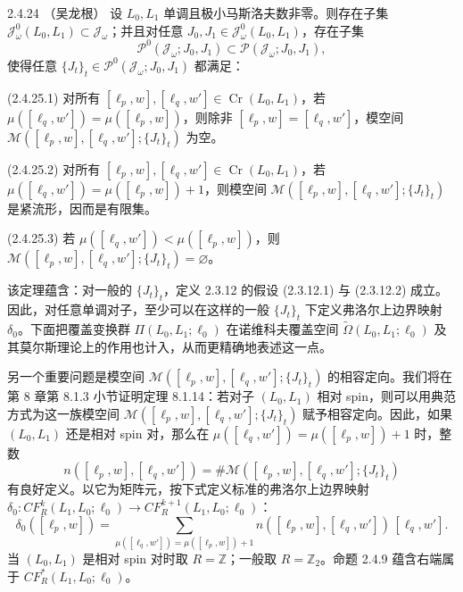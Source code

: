 \begin{theorem}{2.4.24}\label{thm:2-4-24}
\textup{（吴龙根）}\quad
设 $L_0,L_1$ 单调且极小马斯洛夫数非零。则存在子集
$\mathcal J_\omega^0(L_0,L_1)\subset\mathcal J_\omega$；并且对任意
$J_0,J_1\in\mathcal J_\omega^0(L_0,L_1)$，存在子集
\[
  \mathcal P^0(\mathcal J_\omega;J_0,J_1)
  \subset\mathcal P(\mathcal J_\omega;J_0,J_1),
\]
使得任意 $\{J_t\}_t\in\mathcal P^0(\mathcal J_\omega;J_0,J_1)$ 都满足：

\par\smallskip\noindent\textup{(2.4.25.1)}\quad
对所有 $[\ell_p,w],[\ell_q,w']\in\operatorname{Cr}(L_0,L_1)$，若
$\mu([\ell_q,w'])=\mu([\ell_p,w])$，则除非
$[\ell_p,w]=[\ell_q,w']$，模空间
$\mathcal M([\ell_p,w],[\ell_q,w'];\{J_t\}_t)$ 为空。

\par\smallskip\noindent\textup{(2.4.25.2)}\quad
对所有 $[\ell_p,w],[\ell_q,w']\in\operatorname{Cr}(L_0,L_1)$，若
$\mu([\ell_q,w'])=\mu([\ell_p,w])+1$，则模空间
$\mathcal M([\ell_p,w],[\ell_q,w'];\{J_t\}_t)$ 是紧流形，因而是有限集。

\par\smallskip\noindent\textup{(2.4.25.3)}\quad
若 $\mu([\ell_q,w'])<\mu([\ell_p,w])$，则
$\mathcal M([\ell_p,w],[\ell_q,w'];\{J_t\}_t)=\varnothing$。
\end{theorem}

该定理蕴含：对一般的 $\{J_t\}_t$，定义 2.3.12 的假设 (2.3.12.1) 与 (2.3.12.2) 成立。因此，对任意单调对子，至少可以在这样的一般 $\{J_t\}_t$ 下定义弗洛尔上边界映射 $\delta_0$。下面把覆盖变换群 $\Pi(L_0,L_1;\ell_0)$ 在诺维科夫覆盖空间 $\widetilde\Omega(L_0,L_1;\ell_0)$ 及其莫尔斯理论上的作用也计入，从而更精确地表述这一点。

另一个重要问题是模空间
$\mathcal M([\ell_p,w],[\ell_q,w'];\{J_t\}_t)$ 的相容定向。我们将在第 8 章第 8.1.3 小节证明定理 8.1.14：若对子 $(L_0,L_1)$ 相对 spin，则可以用典范方式为这一族模空间
$\mathcal M([\ell_p,w],[\ell_q,w'];\{J_t\}_t)$ 赋予相容定向。因此，如果 $(L_0,L_1)$ 还是相对 spin 对，那么在
$\mu([\ell_q,w'])=\mu([\ell_p,w])+1$ 时，整数
\[
  n([\ell_p,w],[\ell_q,w'])
  =\#\mathcal M([\ell_p,w],[\ell_q,w'];\{J_t\}_t)
\]
有良好定义。以它为矩阵元，按下式定义标准的弗洛尔上边界映射
$\delta_0:CF_R^k(L_1,L_0;\ell_0)\to CF_R^{k+1}(L_1,L_0;\ell_0)$：
\begin{equation}
  \delta_0([\ell_p,w])
  =\sum_{\mu([\ell_q,w'])=\mu([\ell_p,w])+1}
    n([\ell_p,w],[\ell_q,w'])\,[\ell_q,w'].
  \tag{2.4.26}\label{eq:2-4-26}
\end{equation}
当 $(L_0,L_1)$ 是相对 spin 对时取 $R=\mathbb Z$；一般取
$R=\mathbb Z_2$。命题 2.4.9 蕴含右端属于
$CF_R^*(L_1,L_0;\ell_0)$。

